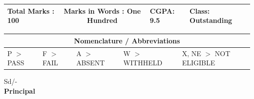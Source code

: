 \documentclass[a4paper,12pt]{article}
\begin{document}
\begin{center}
\begin{tabular}{|m{3cm}|m{6cm}|m{3cm}|m{2cm}|m{4cm}|}
\hline
    \textbf{Total Marks} : 100 & \multicolumn{2}{|c|}{\textbf{Marks in Words} : One Hundred} & \textbf{CGPA}: 9.5 & \textbf{Class}: Outstanding \\
\hline
\end{tabular}
\end{center}

\begin{center}
\begin{tabular}{|m{3cm}|m{3cm}|m{3cm}|m{3cm}|m{4cm}|}
\hline
\multicolumn{5}{|c|}{\textbf{Nomenclature / Abbreviations}} \\
\hline
P $>$ PASS & F $>$ FAIL & A $>$ ABSENT & W $>$ WITHHELD & X, NE $>$ NOT ELIGIBLE \\
\hline
\end{tabular}
\end{center}

\vspace{3cm}
\begin{flushright}
    Sd/- \\
    \textbf{Principal}
\end{flushright}

\vspace{0.5cm}
\noindent
\vfill
\end{document}
